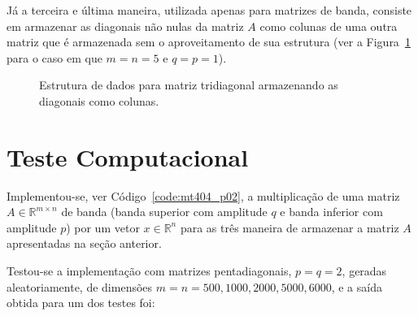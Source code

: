 \documentclass[12pt,a4paper]{article}
\begin{document}
J\'{a} a terceira e \'{u}ltima maneira, utilizada apenas para matrizes de banda, consiste em armazenar as diagonais n\~{a}o nulas da matriz $A$ como colunas de uma outra matriz que é armazenada sem o aproveitamento de sua estrutura (ver a Figura~\ref{fig:est_dados_diag2col} para o caso em que $m = n = 5$ e $q = p = 1$).
\begin{figure}[!htb]
    \centering
    \caption{Estrutura de dados para matriz tridiagonal armazenando as diagonais como colunas.}
    \label{fig:est_dados_diag2col}
\end{figure}

\section{Teste Computacional}
Implementou-se, ver C\'{o}digo~\ref{code:mt404_p02}, a multiplica\c{c}\~{a}o de uma matriz $A \in \mathbb{R}^{m \times n}$ de banda (banda superior com amplitude $q$ e banda inferior com amplitude $p$) por um vetor $x \in \mathbb{R}^n$ para as tr\^{e}s maneira de armazenar a matriz $A$ apresentadas na se\c{c}\~{a}o anterior.

Testou-se a implementa\c{c}\~{a}o com matrizes pentadiagonais, $p = q = 2$, geradas aleatoriamente, de dimens\~{o}es $m = n = 500, 1000, 2000, 5000, 6000$, e a sa\'{i}da obtida para um dos testes foi:

\end{document}
